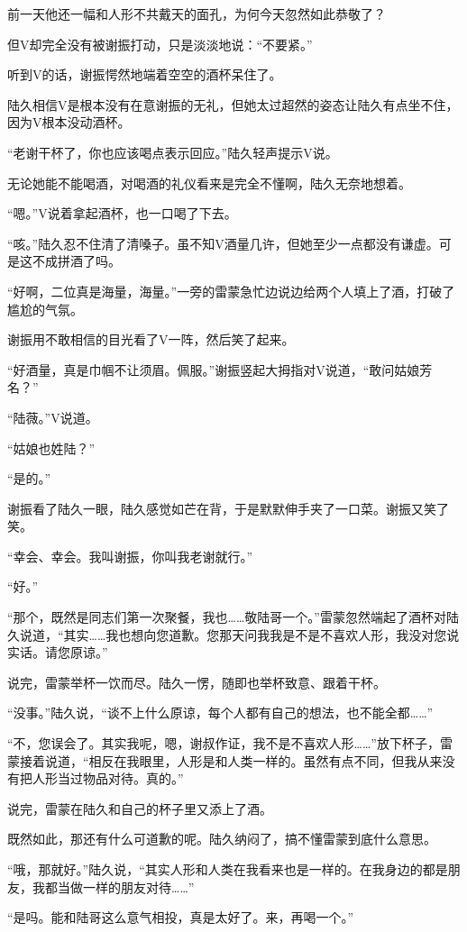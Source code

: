 前一天他还一幅和人形不共戴天的面孔，为何今天忽然如此恭敬了？

但V却完全没有被谢振打动，只是淡淡地说：“不要紧。”

听到V的话，谢振愕然地端着空空的酒杯呆住了。

陆久相信V是根本没有在意谢振的无礼，但她太过超然的姿态让陆久有点坐不住，因为V根本没动酒杯。

 “老谢干杯了，你也应该喝点表示回应。”陆久轻声提示V说。

无论她能不能喝酒，对喝酒的礼仪看来是完全不懂啊，陆久无奈地想着。

“嗯。”V说着拿起酒杯，也一口喝了下去。

“咳。”陆久忍不住清了清嗓子。虽不知V酒量几许，但她至少一点都没有谦虚。可是这不成拼酒了吗。

“好啊，二位真是海量，海量。”一旁的雷蒙急忙边说边给两个人填上了酒，打破了尴尬的气氛。

谢振用不敢相信的目光看了V一阵，然后笑了起来。

“好酒量，真是巾帼不让须眉。佩服。”谢振竖起大拇指对V说道，“敢问姑娘芳名？”

“陆薇。”V说道。

“姑娘也姓陆？”

“是的。”

谢振看了陆久一眼，陆久感觉如芒在背，于是默默伸手夹了一口菜。谢振又笑了笑。

“幸会、幸会。我叫谢振，你叫我老谢就行。”

“好。”

“那个，既然是同志们第一次聚餐，我也……敬陆哥一个。”雷蒙忽然端起了酒杯对陆久说道，“其实……我也想向您道歉。您那天问我我是不是不喜欢人形，我没对您说实话。请您原谅。” 

说完，雷蒙举杯一饮而尽。陆久一愣，随即也举杯致意、跟着干杯。

“没事。”陆久说，“谈不上什么原谅，每个人都有自己的想法，也不能全都……”

“不，您误会了。其实我呢，嗯，谢叔作证，我不是不喜欢人形……”放下杯子，雷蒙接着说道，“相反在我眼里，人形是和人类一样的。虽然有点不同，但我从来没有把人形当过物品对待。真的。”

说完，雷蒙在陆久和自己的杯子里又添上了酒。

既然如此，那还有什么可道歉的呢。陆久纳闷了，搞不懂雷蒙到底什么意思。

“哦，那就好。”陆久说，“其实人形和人类在我看来也是一样的。在我身边的都是朋友，我都当做一样的朋友对待……” 

“是吗。能和陆哥这么意气相投，真是太好了。来，再喝一个。”


